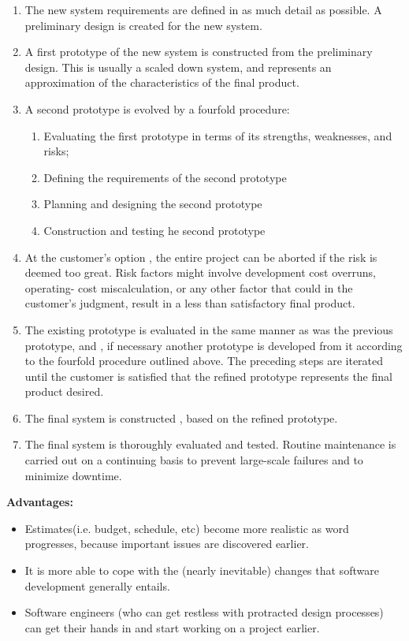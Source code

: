 \begin{enumerate}
 \item The new system requirements are defined in as much detail as possible. A preliminary design is created for the new system. 
 \item A first prototype of the new system is constructed from the preliminary design. This is usually a scaled down system, 
and represents an approximation of the characteristics of the final product. 
 \item A second prototype is evolved by a fourfold procedure:
 \begin{enumerate}
  \item Evaluating the first prototype in terms of its strengths, weaknesses, and risks;
  \item Defining the requirements of the second prototype
  \item Planning and designing the second prototype 
  \item Construction and testing he second prototype 
 \end{enumerate}
 \item At the customer's option , the entire project can be aborted if the risk is deemed too great. Risk factors might 
involve development cost overruns, operating- cost miscalculation, or any other factor that could in the customer's judgment, 
result in a less than satisfactory final product.
 \item The existing prototype is evaluated in the same manner as was the previous prototype, and , if necessary another prototype 
is developed from it according to the fourfold procedure outlined above. The preceding steps are iterated until the customer is 
satisfied that the refined prototype represents the final product desired. 
 \item The final system is constructed , based on the refined prototype. 
 \item The final system is thoroughly evaluated and tested. Routine maintenance is carried out on a continuing basis to prevent 
large-scale failures and to minimize downtime.
\end{enumerate}
\textbf{Advantages:}
\begin{itemize}
 \item Estimates(i.e. budget, schedule, etc) become more realistic as word progresses, because important issues are discovered earlier. 
 \item It is more able to cope with the (nearly inevitable) changes that software development generally entails. 
 \item Software engineers (who can get restless with protracted design processes) can get their hands in and start working 
on a project earlier.
\end{itemize}

